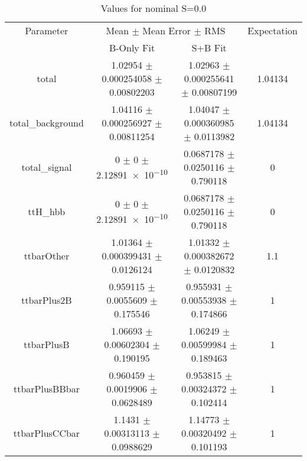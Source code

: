 \begin{table}
\centering
\caption{Values for nominal S=0.0}
\begin{tabular}{cccc}
\toprule
Parameter & \multicolumn{2}{c}{Mean $\pm$ Mean Error $\pm$ RMS} & Expectation\\
 & B-Only Fit & S+B Fit & \\
\midrule
total & \num{1.02954} $\pm$ \num{0.000254058} $\pm$ \num{0.00802203} & \num{1.02963} $\pm$ \num{0.000255641} $\pm$ \num{0.00807199} & \num{1.04134}\\
total\_background & \num{1.04116} $\pm$ \num{0.000256927} $\pm$ \num{0.00811254} & \num{1.04047} $\pm$ \num{0.000360985} $\pm$ \num{0.0113982} & \num{1.04134}\\
total\_signal & \num{0} $\pm$ \num{0} $\pm$ \num{2.12891e-10} & \num{0.0687178} $\pm$ \num{0.0250116} $\pm$ \num{0.790118} & \num{0}\\
ttH\_hbb & \num{0} $\pm$ \num{0} $\pm$ \num{2.12891e-10} & \num{0.0687178} $\pm$ \num{0.0250116} $\pm$ \num{0.790118} & \num{0}\\
ttbarOther & \num{1.01364} $\pm$ \num{0.000399431} $\pm$ \num{0.0126124} & \num{1.01332} $\pm$ \num{0.000382672} $\pm$ \num{0.0120832} & \num{1.1}\\
ttbarPlus2B & \num{0.959115} $\pm$ \num{0.0055609} $\pm$ \num{0.175546} & \num{0.955931} $\pm$ \num{0.00553938} $\pm$ \num{0.174866} & \num{1}\\
ttbarPlusB & \num{1.06693} $\pm$ \num{0.00602304} $\pm$ \num{0.190195} & \num{1.06249} $\pm$ \num{0.00599984} $\pm$ \num{0.189463} & \num{1}\\
ttbarPlusBBbar & \num{0.960459} $\pm$ \num{0.0019906} $\pm$ \num{0.0628489} & \num{0.953815} $\pm$ \num{0.00324372} $\pm$ \num{0.102414} & \num{1}\\
ttbarPlusCCbar & \num{1.1431} $\pm$ \num{0.00313113} $\pm$ \num{0.0988629} & \num{1.14773} $\pm$ \num{0.00320492} $\pm$ \num{0.101193} & \num{1}\\
\bottomrule
\end{tabular}
\end{table}